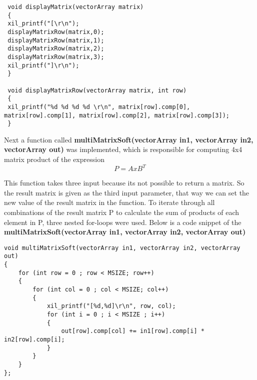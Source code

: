  \begin{lstlisting}
 void displayMatrix(vectorArray matrix)
 {
 xil_printf("[\r\n");
 displayMatrixRow(matrix,0);
 displayMatrixRow(matrix,1);
 displayMatrixRow(matrix,2);
 displayMatrixRow(matrix,3);
 xil_printf("]\r\n");
 }
 
 void displayMatrixRow(vectorArray matrix, int row)
 {
 xil_printf("%d %d %d %d \r\n", matrix[row].comp[0], matrix[row].comp[1], matrix[row].comp[2], matrix[row].comp[3]);
 }
 \end{lstlisting}
 
 Next a function called \textbf{multiMatrixSoft(vectorArray in1, vectorArray in2, vectorArray out)} was implemented, which is responsible for computing 4x4 matrix product of the expression \[ P = A x B^T \]
 
This function takes three input because its not possible to return a matrix. So the result matrix is given as the third input parameter, that way we can set the new value of the result matrix in the function. To iterate through all combinations of the result matrix P to calculate the sum of products of each element in P, three nested for-loops were used. 
Below is a code snippet of the \textbf{multiMatrixSoft(vectorArray in1, vectorArray in2, vectorArray out)}

 \begin{lstlisting}
void multiMatrixSoft(vectorArray in1, vectorArray in2, vectorArray out)
{
	for (int row = 0 ; row < MSIZE; row++)
	{
		for (int col = 0 ; col < MSIZE; col++)
		{
			xil_printf("[%d,%d]\r\n", row, col);
			for (int i = 0 ; i < MSIZE ; i++)
			{
				out[row].comp[col] += in1[row].comp[i] * in2[row].comp[i];
			}
		}
	}
};
\end{lstlisting}

 
 
